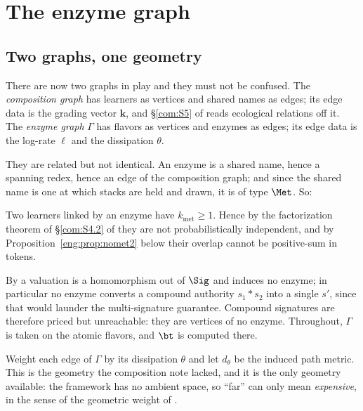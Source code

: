\section{The enzyme graph}\label{eng:S6}
\label{eng:sec:code}

\subsection{Two graphs, one geometry}\label{eng:S6.1}

There are now two graphs in play and they must not be confused. The
\emph{composition graph} has learners as vertices and shared names as
edges; its edge data is the grading vector $\mathbf{k}$, and
\S\ref{com:S5} of \chComp reads ecological relations off it. The \emph{enzyme
graph} $\Gamma$ has flavors as vertices and enzymes as edges; its edge data
is the log-rate $\ell$ and the dissipation $\theta$.

They are related but not identical. An enzyme is a shared name, hence a
spanning redex, hence an edge of the composition graph; and since the
shared name is one at which stacks are held and drawn, it is of type
$\Met$. So:

\begin{proposition}\label{eng:prop:convmet}
Two learners linked by an enzyme have $k_{\mathrm{met}} \geq 1$. Hence by
the factorization theorem of \S\ref{com:S4.2} of \chComp they are not
probabilistically independent, and by
Proposition~\ref{eng:prop:nomet2} below their overlap cannot be positive-sum in
tokens.
\end{proposition}

\begin{remark}\label{eng:vertices-atomic-colours}
By \cite[Prop.~4.4]{vtok} a valuation is a homomorphism out of $\Sig$ and
induces no enzyme; in particular no enzyme converts a compound authority
$s_1 * s_2$ into a single $s'$, since that would launder the multi-signature
guarantee. Compound signatures are therefore priced but unreachable: they
are vertices of no enzyme. Throughout, $\Gamma$ is taken on the atomic
flavors, and $\bt$ is computed there.
\end{remark}

\begin{definition}\label{eng:cost-metric}
Weight each edge of $\Gamma$ by its dissipation $\theta$ and let $d_\theta$
be the induced path metric. This is the geometry the composition note
lacked, and it is the only geometry available: the framework has no ambient
space, so ``far'' can only mean \emph{expensive}, in the sense of the
geometric weight of \cite{CE}.
\end{definition}


